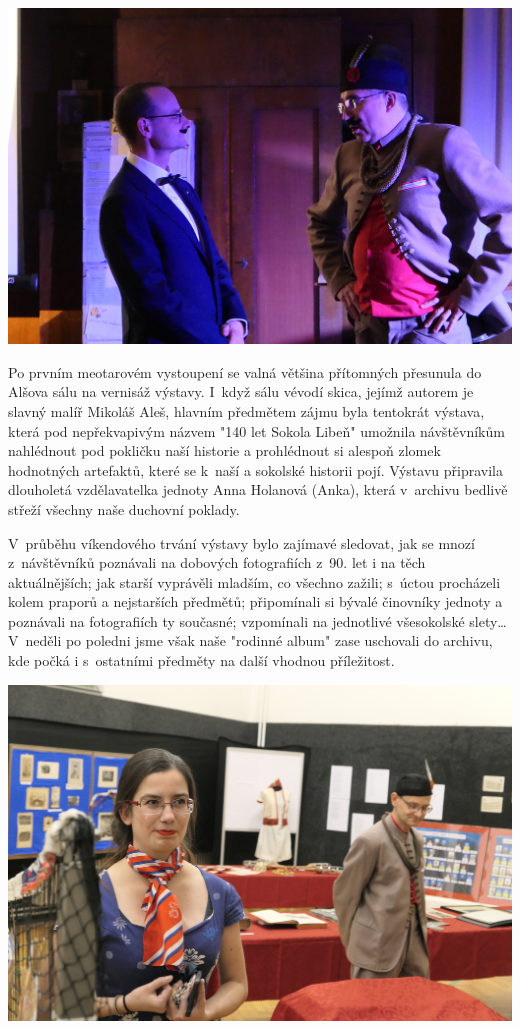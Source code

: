 \documentclass[11pt]{article}
\begin{document}
\begin{center}
  \includegraphics[width=0.7\linewidth]{./FOTKY ZPRAVY/MEOTAR 1.JPG}
\end{center}

Po prvním meotarovém vystoupení se valná většina přítomných přesunula do
Alšova sálu na vernisáž výstavy. I~když sálu vévodí skica, jejímž
autorem je slavný malíř Mikoláš Aleš, hlavním předmětem zájmu byla
tentokrát výstava, která pod nepřekvapivým názvem "140 let Sokola
Libeň" umožnila návštěvníkům nahlédnout pod pokličku naší historie a
prohlédnout si alespoň zlomek hodnotných artefaktů, které se k~naší a
sokolské historii pojí. Výstavu připravila dlouholetá vzdělavatelka
jednoty Anna Holanová (Anka), která v~archivu bedlivě střeží všechny
naše duchovní poklady.

V~průběhu víkendového trvání výstavy bylo zajímavé sledovat, jak se
mnozí z~návštěvníků poznávali na dobových fotografiích z~90. let i na
těch aktuálnějších; jak starší vyprávěli mladším, co všechno zažili;
s~úctou procházeli kolem praporů a nejstarších předmětů; připomínali si
bývalé činovníky jednoty a poznávali na fotografiích ty současné;
vzpomínali na jednotlivé všesokolské slety\ldots{} V~neděli po poledni
jsme však naše "rodinné album" zase uschovali do archivu, kde počká i
s~ostatními předměty na další vhodnou příležitost.


\begin{center}
  \includegraphics[width=0.7\linewidth]{./FOTKY ZPRAVY/VYSTAVA.JPG}
\end{center}
\end{document}
